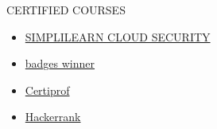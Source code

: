 \documentclass{resume}
\begin{document}
\begin{rSection}{CERTIFIED COURSES}
    \begin{itemize}
        \item \href{https://simpli-web.app.link/e/xZ3GpSgkkMb}{SIMPLILEARN CLOUD SECURITY}
        \item \href{https://www.credly.com/badges/6025a592-85b2-4f2b-ae92-93cf83aa0ef6}{badges winner}
        \item \href{https://app.kajabi.com/certificates/1d00b4fe}{Certiprof}
        \item \href{https://www.hackerrank.com/certificates/79c09382a64c}{Hackerrank}
    \end{itemize}
    \vspace{-0.4em}
\end{rSection}
\end{document}
